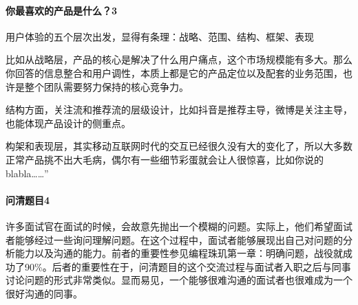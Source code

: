 \documentclass[letterpaper,11pt,english]{sphinxmanual}
\begin{document}
\paragraph{你最喜欢的产品是什么？3\sphinxfootnotemark[297]}
\label{\detokenize{chapter_interview/question:id10}}%
\begin{footnotetext}[297]\sphinxAtStartFootnote
{}
%
\end{footnotetext}\ignorespaces 
用户体验的五个层次出发，显得有条理：战略、范围、结构、框架、表现

比如从战略层，产品的核心是解决了什么用户痛点，这个市场规模能有多大。那么你回答的信息整合和用户调性，本质上都是它的产品定位以及配套的业务范围，也许是整个团队需要努力保持的核心竞争力。

结构方面，关注流和推荐流的层级设计，比如抖音是推荐主导，微博是关注主导，也能体现产品设计的侧重点。

构架和表现层，其实移动互联网时代的交互已经很久没有大的变化了，所以大多数正常产品挑不出大毛病，偶尔有一些细节彩蛋就会让人很惊喜，比如你说的blabla……”


\paragraph{问清题目4\sphinxfootnotemark[298]}
\label{\detokenize{chapter_interview/question:id11}}%
\begin{footnotetext}[298]\sphinxAtStartFootnote
{}
%
\end{footnotetext}\ignorespaces 
许多面试官在面试的时候，会故意先抛出一个模糊的问题。实际上，他们希望面试者能够经过一些询问理解问题。在这个过程中，面试者能够展现出自己对问题的分析能力以及沟通的能力。前者的重要性参见编程珠玑第一章：明确问题，战役就成功了90\%。后者的重要性在于，问清题目的这个交流过程与面试者入职之后与同事讨论问题的形式非常类似。显而易见，一个能够很难沟通的面试者也很难成为一个很好沟通的同事。
\end{document}
